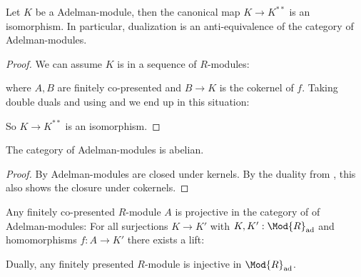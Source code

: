 \begin{theorem}
  \label{coherent-self-dual}
  Let $K$ be a Adelman-module, then the canonical map $K\to K^{\ast\ast}$ is an isomorphism.
  In particular, dualization is an anti-equivalence of the category of Adelman-modules.
\end{theorem}

\begin{proof}
  We can assume $K$ is in a sequence of $R$-modules:
  \begin{center}
  \end{center}
  where $A,B$ are finitely co-presented and $B\to K$ is the cokernel of $f$.
  Taking double duals and using  and  we end up in this situation:
  \begin{center}
  \end{center}
  So $K\to K^{\ast\ast}$ is an isomorphism.
\end{proof}

\begin{theorem}
  \label{coherent-R-modules-abelian}
  The category of Adelman-modules is abelian.
\end{theorem}

\begin{proof}
  By  Adelman-modules are closed under kernels.
  By the duality from , this also shows the closure under cokernels.
\end{proof}

\begin{lemma}
  \label{fcp-projective-fp-injective}
  Any finitely co-presented $R$-module $A$ is projective in the category of of Adelman-modules:
  For all surjections $K\to K'$ with $K,K':\Mod{R}_{\mathrm{ad}}$ and homomorphisms $f:A\to K'$ there exists a lift:
  \begin{center}
\end{center}
  Dually, any finitely presented $R$-module is injective in $\Mod{R}_{\mathrm{ad}}$.
\end{lemma}

